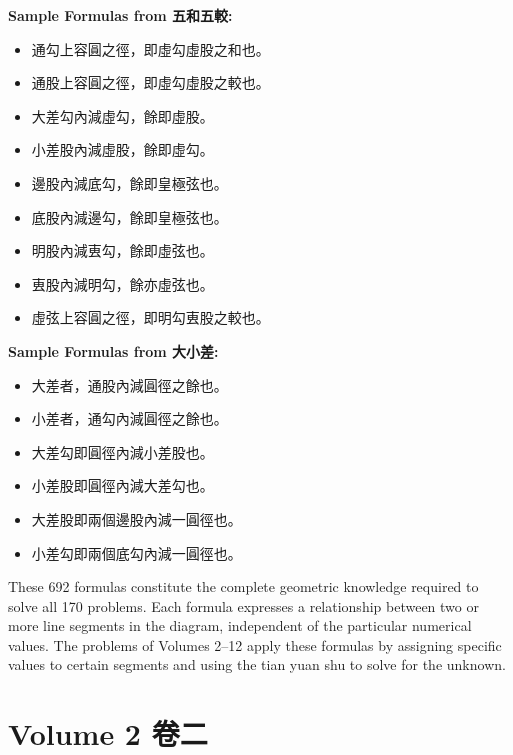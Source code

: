\documentclass[11pt,a4paper]{article}
\begin{document}
\vspace{0.3cm}

\textbf{Sample Formulas from 五和五較:}

\begin{itemize}[leftmargin=2em]
  \item 通勾上容圓之徑，即虛勾虛股之和也。
  \item 通股上容圓之徑，即虛勾虛股之較也。
  \item 大差勾內減虛勾，餘即虛股。
  \item 小差股內減虛股，餘即虛勾。
  \item 邊股內減底勾，餘即皇極弦也。
  \item 底股內減邊勾，餘即皇極弦也。
  \item 明股內減叀勾，餘即虛弦也。
  \item 叀股內減明勾，餘亦虛弦也。
  \item 虛弦上容圓之徑，即明勾叀股之較也。
\end{itemize}

\vspace{0.3cm}

\textbf{Sample Formulas from 大小差:}

\begin{itemize}[leftmargin=2em]
  \item 大差者，通股內減圓徑之餘也。
  \item 小差者，通勾內減圓徑之餘也。
  \item 大差勾即圓徑內減小差股也。
  \item 小差股即圓徑內減大差勾也。
  \item 大差股即兩個邊股內減一圓徑也。
  \item 小差勾即兩個底勾內減一圓徑也。
\end{itemize}

\vspace{0.3cm}

These 692 formulas constitute the complete geometric knowledge required to solve all 170 problems. Each formula expresses a relationship between two or more line segments in the diagram, independent of the particular numerical values. The problems of Volumes 2--12 apply these formulas by assigning specific values to certain segments and using the tian yuan shu to solve for the unknown.

\newpage

\section{Volume 2 \quad 卷二}
\label{sec:vol2}
\end{document}
